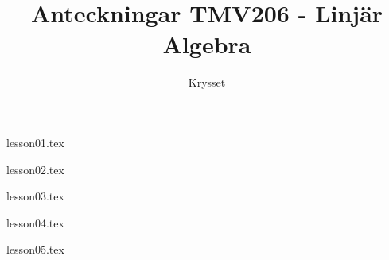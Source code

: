 \documentclass[a4paper]{report}
\title{Anteckningar TMV206 - Linjär Algebra}
\author{Krysset}
\begin{document}
    \maketitle
    \tableofcontents


    {lesson01.tex}

    {lesson02.tex}

    {lesson03.tex}

    {lesson04.tex}

    {lesson05.tex}
\end{document}
